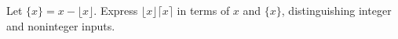 Let $\{x\}=x-\lfloor x\rfloor$. Express $\lfloor x\rfloor\lceil x\rceil$ in terms of $x$ and $\{x\}$, distinguishing integer and noninteger inputs.
